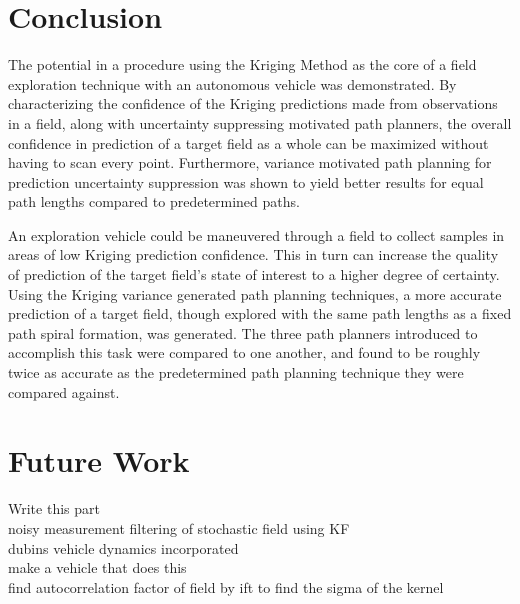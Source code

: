 \chapter*{Conclusion}
The potential in a procedure using the Kriging Method as the core of a field exploration technique with an autonomous vehicle was demonstrated. By characterizing the confidence of the Kriging predictions made from observations in a field, along with uncertainty suppressing motivated path planners, the overall confidence in prediction of a target field as a whole can be maximized without having to scan every point. Furthermore, variance motivated path planning for prediction uncertainty suppression was shown to yield better results for equal path lengths compared to predetermined paths.

An exploration vehicle could be maneuvered through a field to collect samples in areas of low Kriging prediction confidence. This in turn can increase the quality of prediction of the target field's state of interest to a higher degree of certainty. Using the Kriging variance generated path planning techniques, a more accurate prediction of a target field, though explored with the same path lengths as a fixed path spiral formation, was generated. The three path planners introduced to accomplish this task were compared to one another, and found to be roughly twice as accurate as the predetermined path planning technique they were compared against.

\chapter*{Future Work}

Write this part\\
noisy measurement filtering of stochastic field using KF\\
dubins vehicle dynamics incorporated\\
make a vehicle that does this\\
find autocorrelation factor of field by ift to find the sigma of the kernel\\